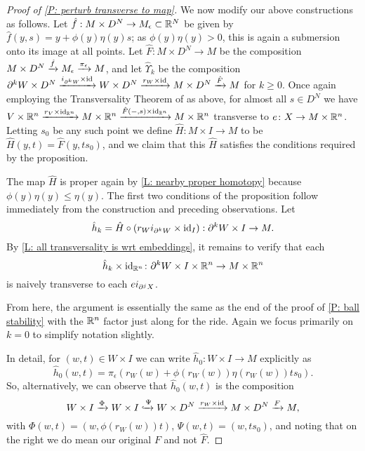 \begin{proof}[Proof of \cref{P: perturb transverse to map}]
	We now modify our above constructions as follows.
	Let $\hat f: M \times D^N \to M_\epsilon \subset \mathbb{R}^N$ be given by $\hat f(y, s) = y +\phi(y) \eta(y) s$; as $\phi(y)\eta(y)>0$, this is again a submersion onto its image at all points.
	Let $\hat F \colon M \times D^N \to M$ be the composition $M \times D^N \xrightarrow{\hat f} M_\epsilon \xrightarrow{\pi_\epsilon} M$, and let $\hat \Upsilon_k$ be the composition $\partial^k W \times D^N \xrightarrow{i_{\partial^k W} \times \mathrm{id}} W \times D^N \xrightarrow{r_W \times \mathrm{id}} M \times D^N \xrightarrow{\hat F} M$ for $k\geq 0$.
	Once again employing the Transversality Theorem of \cite[Section 2.3]{GuPo74} as above, for almost all $s \in D^N$ we have $V \times \mathbb{R}^n \xrightarrow{r_V \times \mathrm{id}_{\mathbb{R}^n}} M \times \mathbb{R}^n \xrightarrow{\hat F(-,s) \times \mathrm{id}_{\mathbb{R}^n}} M \times \mathbb{R}^n$ transverse to $e \colon X \to M \times \mathbb{R}^n$.
	Letting $s_0$ be any such point we define $\hat H \colon M \times I \to M$ to be $\hat H(y,t) = \hat F(y,ts_0)$, and we claim that this $\hat H$ satisfies the conditions required by the proposition.

	The map $\hat H$ is proper again by \cref{L: nearby proper homotopy} because $\phi(y) \eta(y) \leq \eta(y)$.
	The first two conditions of the proposition follow immediately from the construction and preceding observations.
	Let $$\hat h_k = \hat H \circ (r_W i_{\partial^k W} \times \mathrm{id}_I): \partial^k W \times I \to M.$$
	By \cref{L: all transversality is wrt embeddings}, it remains to verify that each $$\hat h_k \times \mathrm{id}_{\mathbb{R}^n} \colon \partial^k W \times I \times \mathbb{R}^n \to M \times \mathbb{R}^n$$ is naively transverse to each $ei_{\partial^j X}$.
	\begin{comment}
		DO WE NEED ANY OF THIS??
		As we already know from the second condition of the proposition that $\hat h(-,1) \times \id_{\R^n}$ is transverse to $e$ and from the hypotheses that $\hat h(-,0)$ is transverse to $e$, it suffices to demonstrated transversality to $e$ of the restriction of $\hat h \times \id_{\R^n}$ to $X \times (0,1) \times \R^n$.
	\end{comment}
	From here, the argument is essentially the same as the end of the proof of \cref{P: ball stability} with the $\mathbb{R}^n$ factor just along for the ride.
	Again we focus primarily on $k=0$ to simplify notation slightly.

	In detail, for $(w,t) \in W \times I$ we can write $\hat h_0 \colon W \times I \to M$ explicitly as
	$$\hat h_0(w,t) = \pi_\epsilon(r_W(w)+\phi(r_W(w))\eta(r_W(w))ts_0).$$
	So, alternatively, we can observe that $\hat h_0 (w,t)$ is the composition
	\begin{equation}\label{E: perturb transverse to map}
		W \times I \xrightarrow{\Phi} W \times I \xhookrightarrow{\Psi} W \times D^N \xrightarrow{r_W \times \mathrm{id}} M \times D^N \xrightarrow{F} M,
	\end{equation}
	with $\Phi(w,t) = (w,\phi(r_W(w))t)$, $\Psi(w,t) = (w,ts_0)$, and noting that on the right we do mean our original $F$ and not $\hat F$.


\end{proof}
